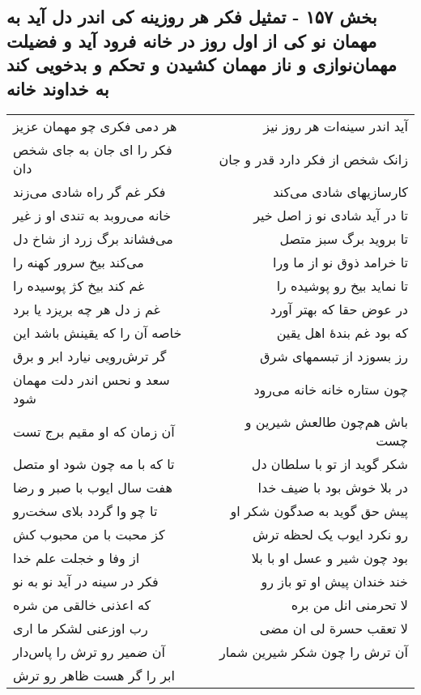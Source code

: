 \begin{center}
\section*{بخش ۱۵۷ - تمثیل فکر هر روزینه کی اندر دل آید به مهمان نو کی از اول روز در خانه فرود آید و فضیلت مهمان‌نوازی و ناز مهمان کشیدن و تحکم و بدخویی کند به خداوند خانه}
\label{sec:sh157}
\begin{longtable}{l p{0.5cm} r}
هر دمی فکری چو مهمان عزیز
&&
آید اندر سینه‌ات هر روز نیز
\\
فکر را ای جان به جای شخص دان
&&
زانک شخص از فکر دارد قدر و جان
\\
فکر غم گر راه شادی می‌زند
&&
کارسازیهای شادی می‌کند
\\
خانه می‌روبد به تندی او ز غیر
&&
تا در آید شادی نو ز اصل خیر
\\
می‌فشاند برگ زرد از شاخ دل
&&
تا بروید برگ سبز متصل
\\
می‌کند بیخ سرور کهنه را
&&
تا خرامد ذوق نو از ما ورا
\\
غم کند بیخ کژ پوسیده را
&&
تا نماید بیخ رو پوشیده را
\\
غم ز دل هر چه بریزد یا برد
&&
در عوض حقا که بهتر آورد
\\
خاصه آن را که یقینش باشد این
&&
که بود غم بندهٔ اهل یقین
\\
گر ترش‌رویی نیارد ابر و برق
&&
رز بسوزد از تبسمهای شرق
\\
سعد و نحس اندر دلت مهمان شود
&&
چون ستاره خانه خانه می‌رود
\\
آن زمان که او مقیم برج تست
&&
باش هم‌چون طالعش شیرین و چست
\\
تا که با مه چون شود او متصل
&&
شکر گوید از تو با سلطان دل
\\
هفت سال ایوب با صبر و رضا
&&
در بلا خوش بود با ضیف خدا
\\
تا چو وا گردد بلای سخت‌رو
&&
پیش حق گوید به صدگون شکر او
\\
کز محبت با من محبوب کش
&&
رو نکرد ایوب یک لحظه ترش
\\
از وفا و خجلت علم خدا
&&
بود چون شیر و عسل او با بلا
\\
فکر در سینه در آید نو به نو
&&
خند خندان پیش او تو باز رو
\\
که اعذنی خالقی من شره
&&
لا تحرمنی انل من بره
\\
رب اوزعنی لشکر ما اری
&&
لا تعقب حسرة لی ان مضی
\\
آن ضمیر رو ترش را پاس‌دار
&&
آن ترش را چون شکر شیرین شمار
\\
ابر را گر هست ظاهر رو ترش

\end{longtable}
\end{center}
